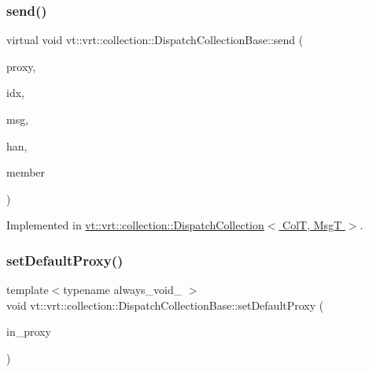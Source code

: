 \mbox{\label{structvt_1_1vrt_1_1collection_1_1_dispatch_collection_base_a207db071c213e894568a8b7ff217cd58}} 
\subsubsection{\texorpdfstring{send()}{send()}}
{\footnotesize\ttfamily virtual void vt\+::vrt\+::collection\+::\+Dispatch\+Collection\+Base\+::send (\begin{DoxyParamCaption}\item[{\hyperlink{namespacevt_a1b417dd5d684f045bb58a0ede70045ac}{Virtual\+Proxy\+Type}}]{proxy,  }\item[{void $\ast$}]{idx,  }\item[{void $\ast$}]{msg,  }\item[{\hyperlink{namespacevt_af64846b57dfcaf104da3ef6967917573}{Handler\+Type}}]{han,  }\item[{bool}]{member }\end{DoxyParamCaption})\hspace{0.3cm}{\ttfamily [pure virtual]}}



Implemented in \hyperlink{structvt_1_1vrt_1_1collection_1_1_dispatch_collection_af44ce95c566067f26f1b4bdf2bcb49a6}{vt\+::vrt\+::collection\+::\+Dispatch\+Collection$<$ Col\+T, Msg\+T $>$}.

\mbox{\label{structvt_1_1vrt_1_1collection_1_1_dispatch_collection_base_a3c5ad977c57108fdcfcc3c2b443428e3}} 
\subsubsection{\texorpdfstring{set\+Default\+Proxy()}{setDefaultProxy()}}
{\footnotesize\ttfamily template$<$typename always\+\_\+void\+\_\+ $>$ \\
void vt\+::vrt\+::collection\+::\+Dispatch\+Collection\+Base\+::set\+Default\+Proxy (\begin{DoxyParamCaption}\item[{\hyperlink{namespacevt_a1b417dd5d684f045bb58a0ede70045ac}{Virtual\+Proxy\+Type} const \&}]{in\+\_\+proxy }\end{DoxyParamCaption})}




